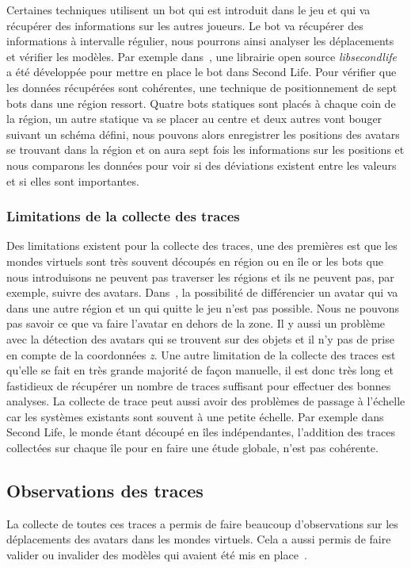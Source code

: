 	\par Certaines techniques utilisent un bot qui est introduit dans le jeu et qui va récupérer des informations sur les autres joueurs. Le bot va récupérer des informations à intervalle régulier, nous pourrons ainsi analyser les déplacements et vérifier les modèles. Par exemple dans~\cite{DBLP:journals/corr/abs-0807-2328}, une librairie open source \textit{libsecondlife} a été développée pour mettre en place le bot dans Second Life. Pour vérifier que les données récupérées sont cohérentes, une technique de positionnement de sept bots dans une région ressort. Quatre bots statiques sont placés à chaque coin de la région, un autre statique va se placer au centre et deux autres vont bouger suivant un schéma défini, nous pouvons alors enregistrer les positions des avatars se trouvant dans la région et on aura sept fois les informations sur les positions et nous comparons les données pour voir si des déviations existent entre les valeurs et si elles sont importantes.\\  
 		\subsubsection{Limitations de la collecte des traces}
	Des limitations existent pour la collecte des traces, une des premières est que les mondes virtuels sont très souvent découpés en région ou en île or les bots que nous introduisons ne peuvent pas traverser les régions et ils ne peuvent pas, par exemple, suivre des avatars. Dans~\cite{DBLP:journals/corr/abs-0807-2328}, la possibilité de différencier un avatar qui va dans une autre région et un qui quitte le jeu n'est pas possible. Nous ne pouvons pas savoir ce que va faire l'avatar en dehors de la zone. Il y aussi un problème avec la détection des avatars qui se trouvent sur des objets et il n'y pas de prise en compte de la coordonnées \textit{z}. Une autre limitation de la collecte des traces est qu'elle se fait en très grande majorité de façon manuelle, il est donc très long et fastidieux de récupérer un nombre de traces suffisant pour effectuer des bonnes analyses. La collecte de trace peut aussi avoir des problèmes de passage à l'échelle car les systèmes existants sont souvent à une petite échelle. Par exemple dans Second Life, le monde étant découpé en îles indépendantes, l'addition des traces collectées sur chaque île pour en faire une étude globale, n'est pas cohérente.

	\subsection{Observations des traces}
	 La collecte de toutes ces traces a permis de faire beaucoup d'observations sur les déplacements des avatars dans les mondes virtuels. Cela a aussi permis de faire valider ou invalider des modèles qui avaient été mis en place~\cite{DBLP:journals/corr/abs-0807-2328}. 
